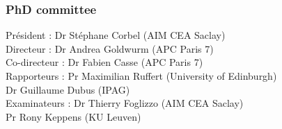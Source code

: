 \documentclass[paper=a4, fontsize=12pt,twoside]{scrartcl}
\begin{document}
\subsubsection*{PhD committee}

Pr\'esident : Dr St\'ephane Corbel (AIM CEA Saclay)\\
Directeur : Dr Andrea Goldwurm (APC Paris 7)\\
Co-directeur : Dr Fabien Casse (APC Paris 7)\\
Rapporteurs : Pr Maximilian Ruffert (University of Edinburgh)\\
\phantom{Rapporteurs :} Dr Guillaume Dubus (IPAG)\\
Examinateurs : Dr Thierry Foglizzo (AIM CEA Saclay)\\
\phantom{Examinateurs :} Pr Rony Keppens (KU Leuven)\\


\end{document}
